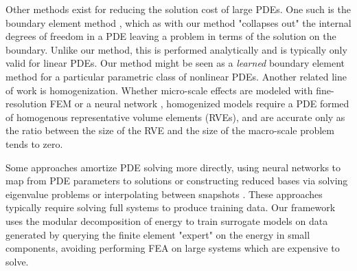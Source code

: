 Other methods exist for reducing the solution cost of large PDEs. One such is the boundary element method \citep{aliabadi2002boundary}, which as with our method "collapses out" the internal degrees of freedom in a PDE leaving a problem in terms of the solution on the boundary. Unlike our method, this is performed analytically and is typically only valid for linear PDEs. Our method might be seen as a \emph{learned} boundary element method for a particular parametric class of nonlinear PDEs. Another related line of work is homogenization. Whether micro-scale effects are modeled with fine-resolution FEM \citep{schroder2014numerical} or a neural network \citep{xue2020data}, homogenized models require a PDE formed of homogenous representative volume elements (RVEs), and are accurate only as the ratio between the size of the RVE and the size of the macro-scale problem tends to zero.

Some approaches amortize PDE solving more directly, using neural networks to map from PDE parameters to solutions \citep{zhu2019physics,nie2020stress} or constructing reduced bases via solving eigenvalue problems or interpolating between snapshots \citep{berkooz1993proper, chatterjee2000introduction}.
These approaches typically require solving full systems to produce training data.
Our framework uses the modular decomposition of energy to train surrogate models on data generated by querying the finite element "expert" on the energy in small components, avoiding performing FEA on large systems which are expensive to solve.
